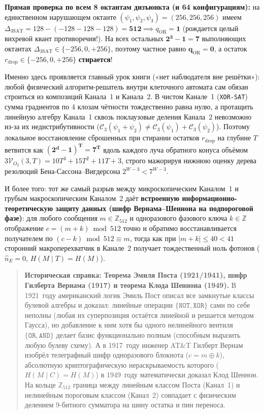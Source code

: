 \noindent\textbf{Прямая проверка по всем 8 октантам дизъюнкта (и 64 конфигурациям):}
на единственном нарушающем октанте $(\psi_1,\psi_2,\psi_3) = (256,256,256)$ имеем $\Delta_{\mathrm{3SAT}} = 128 - (-128 - 128 - 128) = \mathbf{512} \implies q_{\mathrm{OR}} = \mathbf{1}$ (рождается целый вихревой квант противоречия!). На всех остальных $\mathbf{2^3 - 1 = 7}$ выполняющих октантах $\Delta_{\mathrm{3SAT}}\in\{-256,0,+256\}$, поэтому частное равно $\mathbf{q_{\mathrm{OR}} = 0}$, а остаток $r_{\mathrm{drop}}\in\{-256,0,+256\}$ \textbf{стирается}!

Именно здесь проявляется главный урок книги («нет наблюдателя вне решётки»): любой физический алгоритм-решатель внутри клеточного автомата сам обязан строиться из композиций Канала~1 и Канала~2. В чистом Канале~1 (\texttt{XOR-SAT}) сумма градиентов по 4 клозам чётности тождественно равна нулю, а протащить линейную алгебру Канала~1 сквозь поклаузовые деления Канала~2 невозможно из-за их недистрибутивности ($\mathcal{C}_3(\psi_1+\psi_2)\ne\mathcal{C}_3(\psi_1)+\mathcal{C}_3(\psi_2)$). Поэтому локальное восстановление сброшенных при стирании остатков $r_{\mathrm{drop}}$ на глубине $T$ ветвится как $\mathbf{(2^d - 1)^T = 7^T}$ вдоль каждого луча обратного конуса объёмом $3\mathcal{V}_{O_2}(3,T) = 10T^3 + 15T^2 + 11T + 3$, строго мажорируя нижнюю оценку дерева резолюций Бена-Сассона--Вигдерсона $2^{W-3} < 7^{W-3}$.

И более того: тот же самый разрыв между микроскопическим Каналом~1 и грубым макроскопическим Каналом~2 даёт \textbf{встроенную информационно-теоретическую защиту данных (шифр Вернама--Шеннона на подпороговой фазе)}: для любого сообщения $m\in\mathbb{Z}_{512}$ и одноразового фазового ключа $k\in\mathbb{Z}$ отображение $c = (m + k)\bmod 512$ точно и обратимо восстанавливается получателем по $(c - k)\bmod 512 \equiv m$, тогда как при $|m+k|\le 40 < 41$ сторонний макроперехватчик в Канале~2 получает тождественный ноль фотонов ($\hat{n}_E = 0$, $H(M\mid T) = H(M)$).

\begin{quote}
\small\textbf{Историческая справка: Теорема Эмиля Поста (1921/1941), шифр Гилберта Вернама (1917) и теорема Клода Шеннона (1949).}
В 1921~году американский логик Эмиль Пост описал все замкнутые классы булевой алгебры и доказал: линейные операции $\{\texttt{NOT}, \texttt{XOR}\}$ сами по себе неполны (любая их суперпозиция остаётся линейной и решается методом Гаусса), но добавление к ним хотя бы одного нелинейного вентиля $\{\texttt{OR}, \texttt{AND}\}$ делает базис функционально полным (способным выразить любую булеву схему). А в 1917~году инженер AT\&T Гилберт Вернам изобрёл телеграфный шифр одноразового блокнота ($c = m \oplus k$), абсолютную криптографическую нераскрываемость которого ($H(M\mid C) = H(M)$) в 1949~году математически доказал Клод Шеннон. На кольце $\mathbb{Z}_{512}$ граница между линейным классом Поста (Канал~1) и нелинейным пороговым классом (Канал~2) совпадает с физическим делением 9-битного сумматора на шину остатка и пин переноса.
\end{quote}

